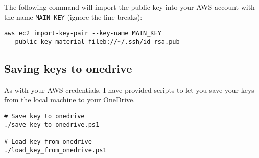 \documentclass{pgnotes}
\begin{document}
The following command will import the public key into your AWS account with the name \texttt{MAIN\_KEY} (ignore the line breaks):
\begin{verbatim}
aws ec2 import-key-pair --key-name MAIN_KEY
 --public-key-material fileb://~/.ssh/id_rsa.pub 
\end{verbatim}

\subsection{Saving keys to onedrive}

As with your AWS credentials, I have provided scripts to let you save your keys from the local machine to your OneDrive.
\begin{verbatim}
# Save key to onedrive
./save_key_to_onedrive.ps1

# Load key from onedrive
./load_key_from_onedrive.ps1
\end{verbatim}
\end{document}
